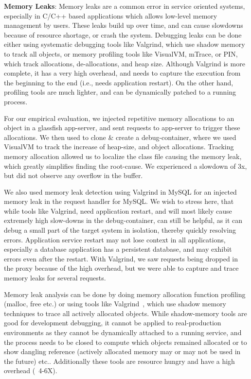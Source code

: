 \noindent
\textbf{Memory Leaks}: %
Memory leaks are a common error in service oriented systems, especially in C/C++ based applications which allows low-level memory management by users.
These leaks build up over time, and can cause slowdowns because of resource shortage, or crash the system.
Debugging leaks can be done either using systematic debugging tools like Valgrind, which use shadow memory to track all objects, or memory profiling tools like VisualVM, mTrace, or PIN, which track allocations, de-allocations, and heap size.
Although Valgrind is more complete, it has a very high overhead, and needs to capture the execution from the beginning to the end (i.e., needs application restart).
On the other hand, profiling tools are much lighter, and can be dynamically patched to a running process.

For our empirical evaluation, we injected repetitive memory allocations to an object in a glassfish app-server, and sent requests to app-server to trigger these allocations.
We then used \parikshan to clone \& create a debug-container, where we used VisualVM to track the increase of heap-size, and object allocations.
Tracking memory allocation allowed us to localize the class file causing the memory leak, which greatly simplifies finding the root-cause.
We experienced a slowdown of 3x, but did not observe any overflow in the buffer.

We also used memory leak detection using Valgrind in MySQL for an injected memory leak in the request handler for MySQL.
We wish to stress here, that while tools like Valgrind, need application restart, and will most likely cause extremely high slow-downs in the debug-container, \parikshan can still be helpful, as it can debug a small part of the target system in isolation, thereby quickly resolving errors.
Application service restart may not lose context in all applications, especially a database application has a persistent database, and may exhibit errors even after the restart.
With Valgrind, we saw requests being dropped in the proxy because of the high overhead, but we were able to capture and trace memory leaks for several requests.


\iffalse
Memory leak analysis can be done by doing memory allocation function profiling (malloc, free etc.) or using tools like Valgrind~\cite{valgrind}, which use shadow memory techniques to trace all actively allocated objects.
While shadow-memory tools are good for development debugging, it cannot be applied to real-production environments as they cannot be dynamically attached to a running service, and the process needs to be closed to compute which objects remained allocated or to show dangling reference (actively allocated memory may or may not be used in the future) etc.. Additionally these tools are resource hungry and have a high overhead (~4-6X).

